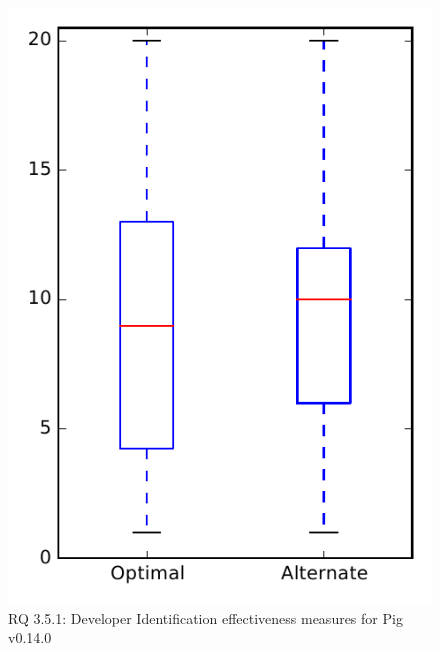 
\begin{figure}
\centering
\includegraphics[height=0.4\textheight]{figures/combo/dit_rq1_pig}
\caption{RQ 3.5.1: Developer Identification effectiveness measures for Pig v0.14.0}
\label{fig:dit:rq1:pig}
\end{figure}
